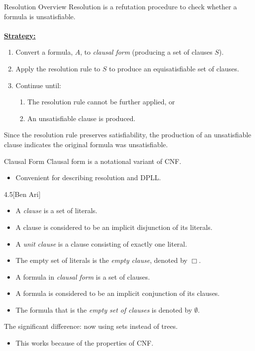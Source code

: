 \documentclass[style=sailor,size=12pt]{powerdot}
\begin{document}
\begin{wideslide}[bm=,toc=]{Resolution Overview}
Resolution is a refutation procedure to check whether a formula is
unsatisfiable.\\
~\\
{\bf \underline{Strategy:}}\\
\begin{enumerate}
\item Convert a formula, $A$, to \emph{clausal form} (producing a set of clauses $S$).
\item Apply the resolution rule to $S$ to produce an equisatisfiable set of
clauses.
\item Continue until:
\begin{enumerate}
\item The resolution rule cannot be further applied, or
\item An unsatisfiable clause is produced.
\end{enumerate}
\end{enumerate}
Since the resolution rule preserves satisfiability, the production of an
unsatisfiable clause indicates the original formula was unsatisfiable.
\end{wideslide}

\begin{wideslide}[bm=,toc=]{Clausal Form}
Clausal form is a notational variant of CNF.
\begin{itemize}
\item Convenient for describing resolution and DPLL.
\end{itemize}

\begin{defn}{4.5}[Ben Ari]
\end{defn}
\vspace*{-3ex}
\begin{itemize}
\item A \emph{clause} is a set of literals.  
\item A clause is considered to be an implicit disjunction of its literals.
\item A \emph{unit clause} is a clause consisting of exactly one literal.
\item The empty set of literals is the \emph{empty clause}, denoted by $\Box$.
\item A formula in \emph{clausal form} is a set of clauses.
\item A formula is considered to be an implicit conjunction of its clauses.
\item The formula that is the \emph{empty set of clauses} is denoted by
$\emptyset$.
\end{itemize}

The significant difference: now using sets instead of trees.
\begin{itemize}
\item This works because of the properties of CNF. 
\end{itemize}
\end{wideslide}
\end{document}
